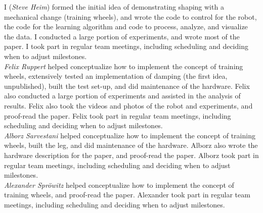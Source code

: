 I (\emph{Steve Heim}) formed the initial idea of demonstrating shaping with a mechanical change (training wheels), and wrote the code to control for the robot, the code for the learning algorithm and code to process, analyze, and visualize the data. I conducted a large portion of experiments, and wrote most of the paper. I took part in regular team meetings, including scheduling and deciding when to adjust milestones. \\
\emph{Felix Ruppert} helped conceptualize how to implement the concept of training wheels, extensively tested an implementation of damping (the first idea, unpublished), built the test set-up, and did maintenance of the hardware. Felix also conducted a large portion of experiments and assisted in the analysis of results. Felix also took the videos and photos of the robot and experiments, and proof-read the paper. Felix took part in regular team meetings, including scheduling and deciding when to adjust milestones. \\
\emph{Alborz Sarvestani} helped conceptualize how to implement the concept of training wheels, built the leg, and did maintenance of the hardware. Alborz also wrote the hardware description for the paper, and proof-read the paper. Alborz took part in regular team meetings, including scheduling and deciding when to adjust milestones. \\
\emph{Alexander Spr\"{o}witz} helped conceptualize how to implement the concept of training wheels, and proof-read the paper. Alexander took part in regular team meetings, including scheduling and deciding when to adjust milestones.


